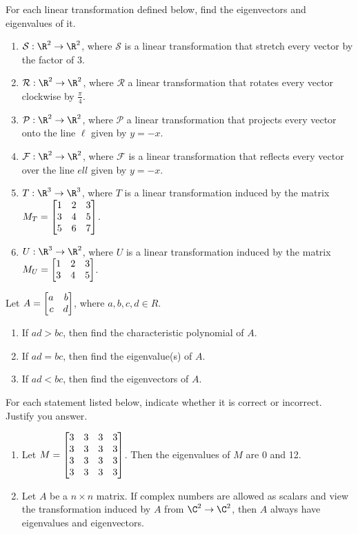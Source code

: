 \begin{exercises}
	\begin{problist}
		\prob  	For each linear transformation defined below, find the eigenvectors and eigenvalues of it.
    		\begin{enumerate}
    			\item   $\mathcal S:\R^2\to\R^2$, where $\mathcal S$ is a linear transformation that stretch every vector by the factor of $3$.
    			\item   $\mathcal R:\R^2\to\R^2$, where $\mathcal R$ a linear transformation that rotates every vector clockwise by $\frac{\pi}{4}$.
    			\item   $\mathcal P:\R^2\to\R^2$, where $\mathcal P$ a linear transformation that projects every vector onto the line $\ell$ given by $y=-x$.
    			\item   $\mathcal F:\R^2\to\R^2$, where $\mathcal F$ is a linear transformation that reflects every vector over the line $ell$ given by $y=-x$.
    			\item   $T:\R^3\to\R^3$, where $T$ is a linear transformation induced by the matrix $M_T = \mat{1&2&3\\3&4&5\\5&6&7}$.
    			\item   $U:\R^3\to\R^2$, where $U$ is a linear transformation induced by the matrix $M_U = \mat{1&2&3\\3&4&5}$.
    		\end{enumerate}
    		
		\prob Let $A = \mat{a&b\\c&d}$, where $a,b,c,d \in R$.
		    \begin{enumerate}
		        \item   If $ad > bc$, then find the characteristic polynomial of $A$.
		        \item   If $ad = bc$, then find the eigenvalue(s) of $A$.
		        \item   If $ad < bc$, then find the eigenvectors of $A$.
		    \end{enumerate}
        
        \prob For each statement listed below, indicate whether it is correct or incorrect. Justify you answer.
            \begin{enumerate}
                \item   Let $M = \mat{3&3&3&3\\3&3&3&3\\3&3&3&3\\3&3&3&3}$. Then the eigenvalues of $M$ are 0 and 12.
                \item   Let $A$ be a $n \times n$ matrix. If complex numbers are allowed as scalars and view the transformation induced by $A$ from $\C^2\to\C^2$, then $A$ always have eigenvalues and eigenvectors.
            \end{enumerate}
	\end{problist}
\end{exercises}

